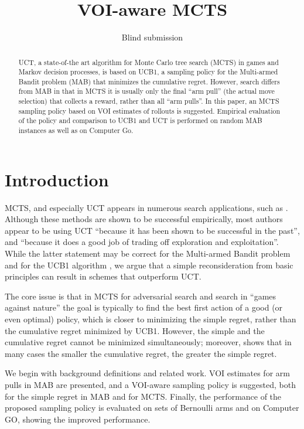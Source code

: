 \documentclass{ecai2012}
\title{VOI-aware MCTS}
\author {Blind submission}
\begin{document}
\maketitle

\begin{abstract}
UCT, a state-of-the art algorithm for Monte Carlo tree search (MCTS)
in games and Markov decision processes, is based on UCB1, a sampling
policy for the Multi-armed Bandit problem (MAB) that 
minimizes the cumulative regret.  However, search differs from MAB in
that in MCTS it is usually only the final ``arm pull'' (the actual
move selection) that collects a reward, rather than all ``arm pulls''.
In this paper, an MCTS sampling policy based on VOI estimates of rollouts is
suggested. Empirical evaluation of the policy and comparison to
UCB1 and UCT is performed on random MAB instances
as well as on Computer Go.
\end{abstract}

\section{Introduction}

MCTS, and especially UCT \cite{Kocsis.uct} appears in numerous search
applications, such as \cite{Eyerich.ctp}. Although these methods are
shown to be successful empirically, most authors appear to be using
UCT ``because it has been shown to be successful in the past'', and
``because it does a good job of trading off exploration and
exploitation''. While the latter statement may be correct for the
Multi-armed Bandit problem and for the UCB1 algorithm \cite{Auer.ucb},
we argue that a simple reconsideration from basic principles can
result in schemes that outperform UCT.

The core issue is that in MCTS for adversarial search and search in
``games against nature'' the goal is typically to find the best
first action of a good (or even optimal) policy, which is closer to
minimizing the simple regret, rather than the cumulative regret
minimized by UCB1.  However, the simple and the cumulative regret
cannot be minimized simultaneously; moreover, \cite{Bubeck.pure} shows
that in many cases the smaller the cumulative regret, the greater the
simple regret.

We begin with background definitions and related work.  VOI estimates
for arm pulls in MAB are presented, and a VOI-aware sampling policy is
suggested, both for the simple regret in MAB and for MCTS.  Finally,
the performance of the proposed sampling policy is evaluated on sets
of Bernoulli arms and on Computer GO, showing the improved
performance.
\end{document}
